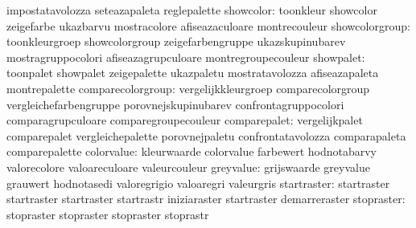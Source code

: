                                   impostatavolozza                 seteazapaleta
                                  reglepalette
                       showcolor: toonkleur                        showcolor
                                  zeigefarbe                       ukazbarvu
                                  mostracolore                     afiseazaculoare
                                  montrecouleur
                  showcolorgroup: toonkleurgroep                   showcolorgroup
                                  zeigefarbengruppe                ukazskupinubarev
                                  mostragruppocolori               afiseazagrupculoare
                                  montregroupecouleur
                       showpalet: toonpalet                        showpalet
                                  zeigepalette                     ukazpaletu
                                  mostratavolozza                  afiseazapaleta
                                  montrepalette
               comparecolorgroup: vergelijkkleurgroep              comparecolorgroup
                                  vergleichefarbengruppe           porovnejskupinubarev
                                  confrontagruppocolori            comparagrupculoare
                                  comparegroupecouleur
                    comparepalet: vergelijkpalet                   comparepalet
                                  vergleichepalette                porovnejpaletu
                                  confrontatavolozza               comparapaleta
                                  comparepalette
                      colorvalue: kleurwaarde                      colorvalue
                                  farbewert                        hodnotabarvy
                                  valorecolore                     valoareculoare
                                  valeurcouleur
                       greyvalue: grijswaarde                      greyvalue
                                  grauwert                         hodnotasedi
                                  valoregrigio                     valoaregri
                                  valeurgris
                     startraster: startraster                      startraster
                                  startraster                      startrastr
                                  iniziaraster                     startraster
                                  demarreraster
                      stopraster: stopraster                       stopraster
                                  stopraster                       stoprastr
